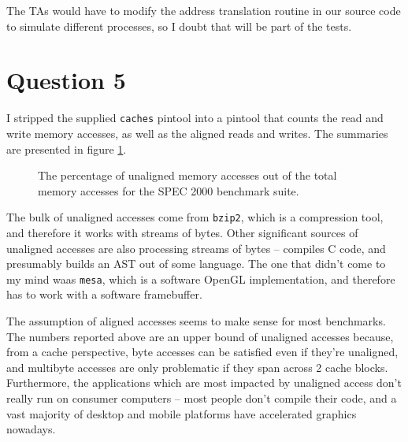 The TAs would have to modify the address translation routine in our source code
to simulate different processes, so I doubt that will be part of the tests. 

\section{Question 5}

I stripped the supplied \texttt{caches} pintool into a pintool that counts the
read and write memory accesses, as well as the aligned reads and writes. The
summaries are presented in figure \ref{q5:unaligned_accesses}.

\begin{figure}[htb]
\center

\caption{The percentage of unaligned memory accesses out of the total memory
accesses for the SPEC 2000 benchmark suite. }
\label{q5:unaligned_accesses}
\end{figure}

The bulk of unaligned accesses come from \texttt{bzip2}, which is a
compression tool, and therefore it works with streams of bytes. Other
significant sources of unaligned accesses are also processing streams
of bytes --  compiles C code, and  presumably builds an
AST out of some language. The one that didn't come to my mind waas
\texttt{mesa}, which is a software OpenGL implementation, and therefore has to
work with a software framebuffer.

The assumption of aligned accesses seems to make sense for most benchmarks. The
numbers reported above are an upper bound of unaligned accesses because, from a
cache perspective, byte accesses can be satisfied even if they're unaligned, and
multibyte accesses are only problematic if they span across 2 cache blocks.
Furthermore, the applications which are most impacted by unaligned access don't
really run on consumer computers -- most people don't compile their code, and a
vast majority of desktop and mobile platforms have accelerated graphics
nowadays.
